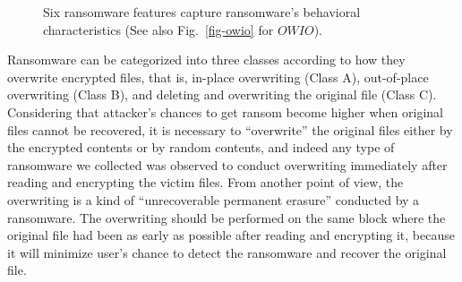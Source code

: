 \documentclass[conference]{IEEEtran}
\begin{document}
\begin{figure}[t]
\caption{Six ransomware features capture ransomware's behavioral characteristics (See also Fig.~\ref{fig-owio} for $OWIO$).}\label{fig-op}
\end{figure}



Ransomware can be categorized into three classes 
according to how they overwrite encrypted files, that is, 
in-place overwriting (Class A), out-of-place overwriting (Class B), 
and deleting and overwriting the original file (Class C). 
Considering that 
attacker's chances to get ransom become higher when original files cannot be recovered,
it is necessary to ``overwrite'' the original files either by the encrypted contents
or by random contents, and indeed any type of ransomware we collected 
was observed to conduct overwriting immediately after reading and encrypting 
the victim files. From another point of view, the overwriting is a kind of 
``unrecoverable permanent erasure'' conducted by a ransomware. The overwriting should be performed 
on the same block where the original file had been as early as possible after reading
and encrypting it, because it will minimize user's chance to detect the ransomware and
recover the original file. 
\end{document}
